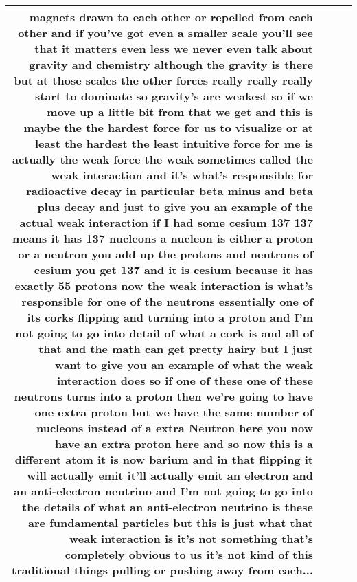 \documentclass[10pt]{article}
\begin{document}
\begin{tiny}
\begin{longtable}{|r|p{0.375in}|p{1.275in}|p{3.5in}|}
magnets drawn to each other or repelled from each other and if you've got even a smaller scale you'll see that it matters even less we never even talk about gravity and chemistry although the gravity is there but at those scales the other forces really really really start to dominate so gravity's are weakest so if we move up a little bit from that we get and this is maybe the the hardest force for us to visualize or at least the hardest the least intuitive force for me is actually the weak force the weak sometimes called the weak interaction and it's what's responsible for radioactive decay in particular beta minus and beta plus decay and just to give you an example of the actual weak interaction if I had some cesium 137 137 means it has 137 nucleons a nucleon is either a proton or a neutron you add up the protons and neutrons of cesium you get 137 and it is cesium because it has exactly 55 protons now the weak interaction is what's responsible for one of the neutrons essentially one of its corks flipping and turning into a proton and I'm not going to go into detail of what a cork is and all of that and the math can get pretty hairy but I just want to give you an example of what the weak interaction does so if one of these one of these neutrons turns into a proton then we're going to have one extra proton but we have the same number of nucleons instead of a extra Neutron here you now have an extra proton here and so now this is a different atom it is now barium and in that flipping it will actually emit it'll actually emit an electron and an anti-electron neutrino and I'm not going to go into the details of what an anti-electron neutrino is these are fundamental particles but this is just what that weak interaction is it's not something that's completely obvious to us it's not kind of this traditional things pulling or pushing away from each... \\\hline

\end{longtable}
\end{tiny}
\end{document}
